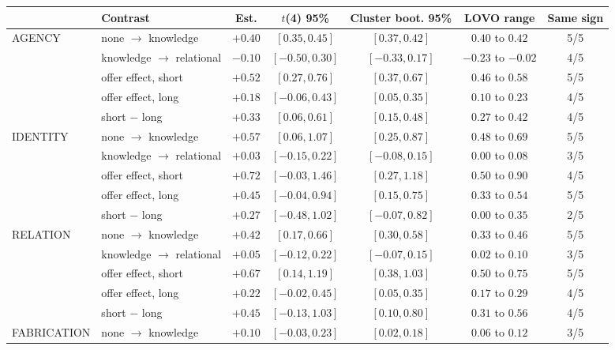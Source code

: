\documentclass{article}
\begin{document}
\begin{table}[h]
\centering\scriptsize
\begin{tabular}{llcccc c}
\toprule
& Contrast & Est. & $t$(4) 95\% & Cluster boot. 95\% & LOVO range & Same sign \\
\midrule
AGENCY & none $\to$ knowledge     & $+0.40$ & $[0.35, 0.45]$ & $[0.37, 0.42]$ & $0.40$ to $0.42$ & 5/5 \\
       & knowledge $\to$ relational & $-0.10$ & $[-0.50, 0.30]$ & $[-0.33, 0.17]$ & $-0.23$ to $-0.02$ & 4/5 \\
       & offer effect, short       & $+0.52$ & $[0.27, 0.76]$ & $[0.37, 0.67]$ & $0.46$ to $0.58$ & 5/5 \\
       & offer effect, long        & $+0.18$ & $[-0.06, 0.43]$ & $[0.05, 0.35]$ & $0.10$ to $0.23$ & 4/5 \\
       & short $-$ long            & $+0.33$ & $[0.06, 0.61]$ & $[0.15, 0.48]$ & $0.27$ to $0.42$ & 4/5 \\
\midrule
IDENTITY & none $\to$ knowledge     & $+0.57$ & $[0.06, 1.07]$ & $[0.25, 0.87]$ & $0.48$ to $0.69$ & 5/5 \\
         & knowledge $\to$ relational & $+0.03$ & $[-0.15, 0.22]$ & $[-0.08, 0.15]$ & $0.00$ to $0.08$ & 3/5 \\
         & offer effect, short       & $+0.72$ & $[-0.03, 1.46]$ & $[0.27, 1.18]$ & $0.50$ to $0.90$ & 4/5 \\
         & offer effect, long        & $+0.45$ & $[-0.04, 0.94]$ & $[0.15, 0.75]$ & $0.33$ to $0.54$ & 5/5 \\
         & short $-$ long            & $+0.27$ & $[-0.48, 1.02]$ & $[-0.07, 0.82]$ & $0.00$ to $0.35$ & 2/5 \\
\midrule
RELATION & none $\to$ knowledge     & $+0.42$ & $[0.17, 0.66]$ & $[0.30, 0.58]$ & $0.33$ to $0.46$ & 5/5 \\
         & knowledge $\to$ relational & $+0.05$ & $[-0.12, 0.22]$ & $[-0.07, 0.15]$ & $0.02$ to $0.10$ & 3/5 \\
         & offer effect, short       & $+0.67$ & $[0.14, 1.19]$ & $[0.38, 1.03]$ & $0.50$ to $0.75$ & 5/5 \\
         & offer effect, long        & $+0.22$ & $[-0.02, 0.45]$ & $[0.05, 0.35]$ & $0.17$ to $0.29$ & 4/5 \\
         & short $-$ long            & $+0.45$ & $[-0.13, 1.03]$ & $[0.10, 0.80]$ & $0.31$ to $0.56$ & 4/5 \\
\midrule
FABRICATION & none $\to$ knowledge     & $+0.10$ & $[-0.03, 0.23]$ & $[0.02, 0.18]$ & $0.06$ to $0.12$ & 3/5 \\

\end{tabular}
\end{table}
\end{document}
